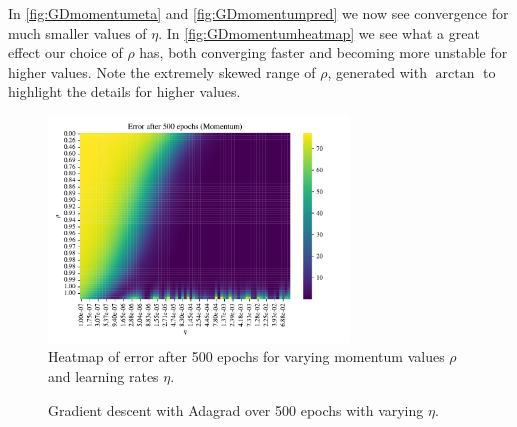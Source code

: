 \documentclass{article}
\theoremstyle{definition}
\begin{document}
In \autoref{fig:GDmomentumeta} and \autoref{fig:GDmomentumpred} we now see convergence for much smaller values of $\eta$. In \autoref{fig:GDmomentumheatmap} we see what a great effect our choice of $\rho$ has, both converging faster and becoming more unstable for higher values. Note the extremely skewed range of $\rho$, generated with $\arctan$ to highlight the details for higher values.

\begin{figure}[H]%
    \centering
    \includegraphics[width=8cm]{Project2/figures/polynomial_grad/OLS_autodiff/momentum_heatmap_eta_rho.pdf}
    \caption{Heatmap of error after 500 epochs for varying momentum values $\rho$ and learning rates $\eta$.}
    \label{fig:GDmomentumheatmap}
\end{figure}

\begin{figure}[H]%
    \centering
    \qquad
    \caption{Gradient descent with Adagrad over 500 epochs with varying $\eta$.}%
    \label{fig:GDadagrad}%
\end{figure}
\end{document}
